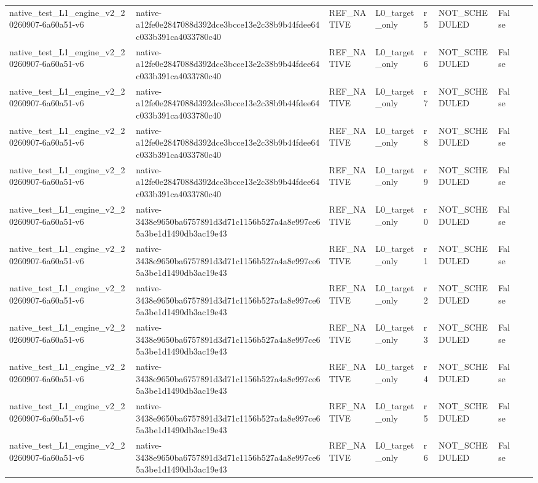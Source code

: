 \begin{tabular}{lllllllll}
native\_test\_L1\_engine\_v2\_20260907-6a60a51-v6 & native-a12fe0e2847088d392dce3bcce13e2c38b9b44fdee64c033b391ca4033780c40 & REF\_NATIVE & L0\_target\_only & r5 & NOT\_SCHEDULED & False &  &  \\
native\_test\_L1\_engine\_v2\_20260907-6a60a51-v6 & native-a12fe0e2847088d392dce3bcce13e2c38b9b44fdee64c033b391ca4033780c40 & REF\_NATIVE & L0\_target\_only & r6 & NOT\_SCHEDULED & False &  &  \\
native\_test\_L1\_engine\_v2\_20260907-6a60a51-v6 & native-a12fe0e2847088d392dce3bcce13e2c38b9b44fdee64c033b391ca4033780c40 & REF\_NATIVE & L0\_target\_only & r7 & NOT\_SCHEDULED & False &  &  \\
native\_test\_L1\_engine\_v2\_20260907-6a60a51-v6 & native-a12fe0e2847088d392dce3bcce13e2c38b9b44fdee64c033b391ca4033780c40 & REF\_NATIVE & L0\_target\_only & r8 & NOT\_SCHEDULED & False &  &  \\
native\_test\_L1\_engine\_v2\_20260907-6a60a51-v6 & native-a12fe0e2847088d392dce3bcce13e2c38b9b44fdee64c033b391ca4033780c40 & REF\_NATIVE & L0\_target\_only & r9 & NOT\_SCHEDULED & False &  &  \\
native\_test\_L1\_engine\_v2\_20260907-6a60a51-v6 & native-3438e9650ba6757891d3d71c1156b527a4a8e997ce65a3be1d1490db3ac19e43 & REF\_NATIVE & L0\_target\_only & r0 & NOT\_SCHEDULED & False &  &  \\
native\_test\_L1\_engine\_v2\_20260907-6a60a51-v6 & native-3438e9650ba6757891d3d71c1156b527a4a8e997ce65a3be1d1490db3ac19e43 & REF\_NATIVE & L0\_target\_only & r1 & NOT\_SCHEDULED & False &  &  \\
native\_test\_L1\_engine\_v2\_20260907-6a60a51-v6 & native-3438e9650ba6757891d3d71c1156b527a4a8e997ce65a3be1d1490db3ac19e43 & REF\_NATIVE & L0\_target\_only & r2 & NOT\_SCHEDULED & False &  &  \\
native\_test\_L1\_engine\_v2\_20260907-6a60a51-v6 & native-3438e9650ba6757891d3d71c1156b527a4a8e997ce65a3be1d1490db3ac19e43 & REF\_NATIVE & L0\_target\_only & r3 & NOT\_SCHEDULED & False &  &  \\
native\_test\_L1\_engine\_v2\_20260907-6a60a51-v6 & native-3438e9650ba6757891d3d71c1156b527a4a8e997ce65a3be1d1490db3ac19e43 & REF\_NATIVE & L0\_target\_only & r4 & NOT\_SCHEDULED & False &  &  \\
native\_test\_L1\_engine\_v2\_20260907-6a60a51-v6 & native-3438e9650ba6757891d3d71c1156b527a4a8e997ce65a3be1d1490db3ac19e43 & REF\_NATIVE & L0\_target\_only & r5 & NOT\_SCHEDULED & False &  &  \\
native\_test\_L1\_engine\_v2\_20260907-6a60a51-v6 & native-3438e9650ba6757891d3d71c1156b527a4a8e997ce65a3be1d1490db3ac19e43 & REF\_NATIVE & L0\_target\_only & r6 & NOT\_SCHEDULED & False &  &  \\

\end{tabular}
